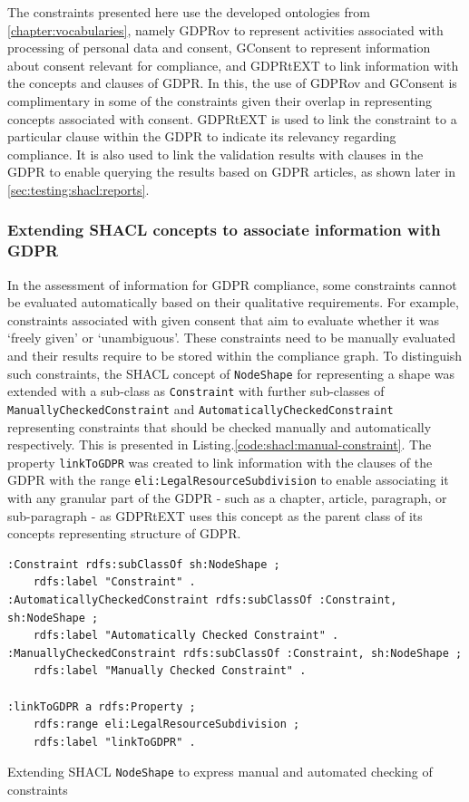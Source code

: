 The constraints presented here use the developed ontologies from \autoref{chapter:vocabularies}, namely GDPRov to represent activities associated with processing of personal data and consent, GConsent to represent information about consent relevant for compliance, and GDPRtEXT to link information with the concepts and clauses of GDPR.
In this, the use of GDPRov and GConsent is complimentary in some of the constraints given their overlap in representing concepts associated with consent.
GDPRtEXT is used to link the constraint to a particular clause within the GDPR to indicate its relevancy regarding compliance. It is also used to link the validation results with clauses in the GDPR to enable querying the results based on GDPR articles, as shown later in \autoref{sec:testing:shacl:reports}.

\subsubsection{Extending SHACL concepts to associate information with GDPR}
In the assessment of information for GDPR compliance, some constraints cannot be evaluated automatically based on their qualitative requirements. For example, constraints associated with given consent that aim to evaluate whether it was `freely given' or `unambiguous'. These constraints need to be manually evaluated and their results require to be stored within the compliance graph.
To distinguish such constraints, the SHACL concept of \texttt{NodeShape} for representing a shape was extended with a sub-class as \texttt{Constraint} with further sub-classes of \texttt{ManuallyCheckedConstraint} and \texttt{AutomaticallyCheckedConstraint} representing constraints that should be checked manually and automatically respectively. This is presented in Listing.\autoref{code:shacl:manual-constraint}.
The property \texttt{linkToGDPR} was created to link information with the clauses of the GDPR with the range \texttt{eli:LegalResourceSubdivision} to enable associating it with any granular part of the GDPR - such as a chapter, article, paragraph, or sub-paragraph - as GDPRtEXT uses this concept as the parent class of its concepts representing structure of GDPR.
\begin{listing}[htbp]
\begin{verbatim}
:Constraint rdfs:subClassOf sh:NodeShape ;
    rdfs:label "Constraint" .
:AutomaticallyCheckedConstraint rdfs:subClassOf :Constraint, sh:NodeShape ;
    rdfs:label "Automatically Checked Constraint" .
:ManuallyCheckedConstraint rdfs:subClassOf :Constraint, sh:NodeShape ;
    rdfs:label "Manually Checked Constraint" .
    
:linkToGDPR a rdfs:Property ;
    rdfs:range eli:LegalResourceSubdivision ;
    rdfs:label "linkToGDPR" .
\end{verbatim}
\caption{Extending SHACL \texttt{NodeShape} to express manual and automated checking of constraints}
\label{code:shacl:manual-constraint}
\end{listing}

